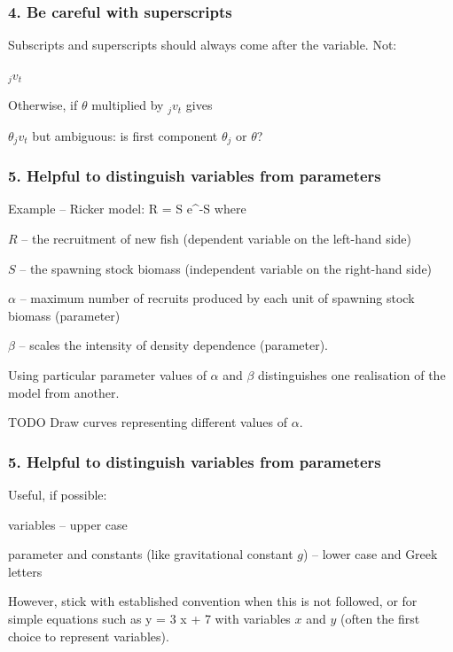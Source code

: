 
\begin{frame}
\frametitle{4. Be careful with superscripts}
Subscripts and superscripts should always come after the variable. Not:
\bi
  \item $_jv_t$
\ei

Otherwise, if $\theta$ multiplied by $_jv_t$ gives
\bi
  \item $\theta_jv_t$
\ei
but ambiguous: is first component $\theta_j$ or $\theta$?


\end{frame}


\begin{frame}
\frametitle{5. Helpful to distinguish variables from parameters}

Example -- Ricker model:
\eb
\nonumber R = \alpha S \mbox{e}^{-\beta S}
\label{ricker}
\ee
where
\bi
  \item $R$ -- the recruitment of new fish (dependent variable on the left-hand
    side)
  \item $S$ -- the spawning stock biomass (independent variable on the right-hand
    side)
  \item $\alpha$ -- maximum number of recruits produced by each unit
  of spawning stock biomass (parameter)
  \item $\beta$ -- scales the intensity of density dependence (parameter).
\ei

Using particular parameter values of $\alpha$ and $\beta$ distinguishes one
realisation of the model from another.

TODO Draw curves representing different values of $\alpha$.

\end{frame}


\begin{frame}
\frametitle{5. Helpful to distinguish variables from parameters}

Useful, if possible:
\bi
 \item variables -- upper case
 \item parameter and constants (like gravitational constant $g$) -- lower case
   and Greek letters
\ei

However, stick with established convention when this is not followed, or for
simple equations such as
\eb
\nonumber y = 3 x + 7
\ee
with variables $x$ and $y$ (often the first choice to represent variables).

\end{frame}

